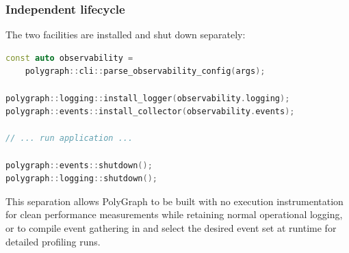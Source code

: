 \subsubsection{Independent lifecycle}

The two facilities are installed and shut down separately:

\begin{lstlisting}[language=C++]
const auto observability =
    polygraph::cli::parse_observability_config(args);

polygraph::logging::install_logger(observability.logging);
polygraph::events::install_collector(observability.events);

// ... run application ...

polygraph::events::shutdown();
polygraph::logging::shutdown();
\end{lstlisting}

This separation allows PolyGraph to be built with no execution instrumentation for
clean performance measurements while retaining normal operational logging, or to
compile event gathering in and select the desired event set at runtime for detailed
profiling runs.
